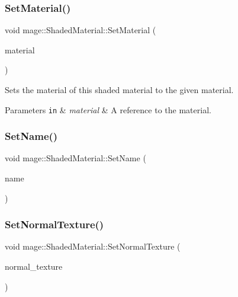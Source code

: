 \hypertarget{structmage_1_1_shaded_material_aca5966123c3267d431539bea500d244b}{}\label{structmage_1_1_shaded_material_aca5966123c3267d431539bea500d244b} 
\subsubsection{\texorpdfstring{Set\+Material()}{SetMaterial()}}
{\footnotesize\ttfamily void mage\+::\+Shaded\+Material\+::\+Set\+Material (\begin{DoxyParamCaption}\item[{const \hyperlink{structmage_1_1_material}{Material} \&}]{material }\end{DoxyParamCaption})}

Sets the material of this shaded material to the given material.


\begin{DoxyParams}[1]{Parameters}
\mbox{\tt in}  & {\em material} & A reference to the material. \\
\hline
\end{DoxyParams}
\hypertarget{structmage_1_1_shaded_material_a3f8d05c818362ef37bfcf9a02769d0ff}{}\label{structmage_1_1_shaded_material_a3f8d05c818362ef37bfcf9a02769d0ff} 
\subsubsection{\texorpdfstring{Set\+Name()}{SetName()}}
{\footnotesize\ttfamily void mage\+::\+Shaded\+Material\+::\+Set\+Name (\begin{DoxyParamCaption}\item[{const string \&}]{name }\end{DoxyParamCaption})}

\hypertarget{structmage_1_1_shaded_material_a681531e5a979ebdc4a0e8933a2439c0f}{}\label{structmage_1_1_shaded_material_a681531e5a979ebdc4a0e8933a2439c0f} 
\subsubsection{\texorpdfstring{Set\+Normal\+Texture()}{SetNormalTexture()}}
{\footnotesize\ttfamily void mage\+::\+Shaded\+Material\+::\+Set\+Normal\+Texture (\begin{DoxyParamCaption}\item[{\hyperlink{namespacemage_a1e01ae66713838a7a67d30e44c67703e}{Shared\+Ptr}$<$ \hyperlink{classmage_1_1_texture}{Texture} $>$}]{normal\+\_\+texture }\end{DoxyParamCaption})}

